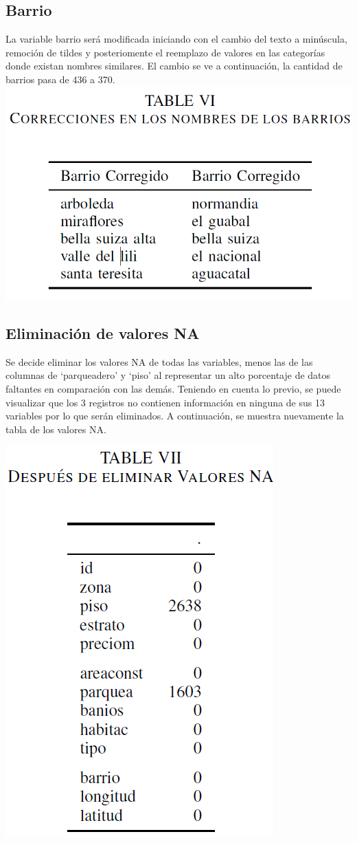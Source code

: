 \documentclass[conference,final,]{IEEEtran}
\begin{document}
\subsection{\textbf{Barrio}}

La variable barrio será modificada iniciando con el cambio del texto a
minúscula, remoción de tildes y posteriomente el reemplazo de valores en
las categorías donde existan nombres similares. El cambio se ve a
continuación, la cantidad de barrios pasa de 436 a 370.\\

\includegraphics[width=0.8\linewidth]{images/Tabla6}

\subsection{\textbf{Eliminación de valores NA}}

Se decide eliminar los valores NA de todas las variables, menos las de
las columnas de `parqueadero' y `piso' al representar un alto porcentaje
de datos faltantes en comparación con las demás. Teniendo en cuenta lo
previo, se puede visualizar que los 3 registros no contienen información
en ninguna de sus 13 variables por lo que serán eliminados. A
continuación, se muestra nuevamente la tabla de los valores NA.

\begin{center}\includegraphics[width=0.5\linewidth]{images/Table7} \end{center}
\end{document}
